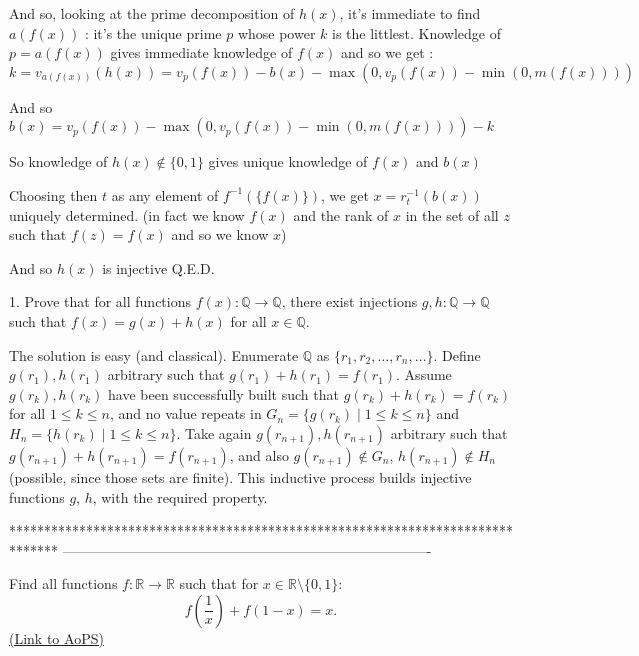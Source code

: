 \begin{solution}
And so, looking at the prime decomposition of $h(x)$, it's immediate to find $a(f(x))$ : it's the unique prime $p$ whose power $k$ is the littlest.
Knowledge of $p=a(f(x))$ gives immediate knowledge of $f(x)$
and so we get :
$k=v_{a(f(x))}(h(x))=v_p(f(x))-b(x)-\max(0,v_p(f(x))-\min(0,m(f(x))))$

And so $b(x)=v_p(f(x))-\max(0,v_p(f(x))-\min(0,m(f(x))))-k$

So knowledge of $h(x)\notin\{0,1\}$ gives unique knowledge of $f(x)$ and $b(x)$

Choosing then $t$ as any element of $f^{-1}(\{f(x)\})$, we get $x=r_t^{-1}(b(x))$ uniquely determined.
(in fact we know $f(x)$ and the rank of $x$ in the set of all $z$ such that $f(z)=f(x)$ and so we know $x$)

And so $h(x)$ is injective
Q.E.D.
\end{solution}



\begin{solution}
	\begin{tcolorbox}1. Prove that for all functions $f(x): \mathbb{Q} \to\mathbb{Q}$, there exist injections $g,h: \mathbb{Q} \to \mathbb{Q}$ such that $f(x)=g(x)+h(x)$ for all $x \in \mathbb{Q}$.
\end{tcolorbox}


The solution is easy (and classical). Enumerate $\mathbb{Q}$ as $\{r_1,r_2,\ldots,r_n,\ldots\}$. Define $g(r_1), h(r_1)$ arbitrary such that $g(r_1)+h(r_1) = f(r_1)$. Assume $g(r_k), h(r_k)$ have been successfully built such that $g(r_k)+h(r_k) = f(r_k)$ for all $1\leq k \leq n$, and no value repeats in $G_n = \{g(r_k) \mid 1\leq k \leq n\}$ and  $H_n = \{h(r_k) \mid 1\leq k \leq n\}$. Take again $g(r_{n+1}), h(r_{n+1})$ arbitrary such that $g(r_{n+1})+h(r_{n+1}) = f(r_{n+1})$, and also $g(r_{n+1}) \not \in G_n$, $h(r_{n+1}) \not \in H_n$ (possible, since those sets are finite). This inductive process builds injective functions $g$, $h$, with the required property.
\end{solution}
*******************************************************************************
-------------------------------------------------------------------------------

\begin{problem}
	Find all functions $f: \mathbb R \to \mathbb R$ such that for $x \in \mathbb R \setminus \{0,1\}$:
\[f\left(\frac {1}{x} \right)+ f(1-x) = x.\]
	\flushright \href{https://artofproblemsolving.com/community/c6h411718}{(Link to AoPS)}
\end{problem}



